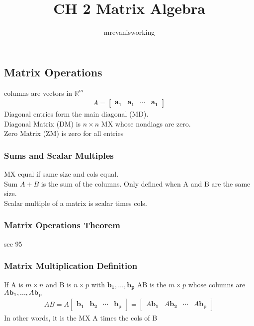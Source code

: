 \documentclass[12pt]{article}
\newcommand{\R}{\mathbb{R}}
\begin{document}
\title{CH 2 Matrix Algebra}
\author{mrevanisworking}
\maketitle

\subsection{Matrix Operations}
    columns are vectors in $ \R^m $ 
    \begin{align*}
        A = \begin{bmatrix}
            \bm{a_{1}} & \bm{a_{1}} & \cdots & \bm{a_{1}} 
        \end{bmatrix}
    \end{align*} 
    Diagonal entries form the main diagonal (MD). \\
    Diagonal Matrix (DM) is $ n \times n $  MX whose nondiags are zero. \\
    Zero Matrix (ZM) is zero for all entries 
    \subsubsection{Sums and Scalar Multiples}
        MX equal if same size and cols equal. \\
        Sum $ A + B $  is the sum of the columns. Only defined when A and B
        are the same size. \\
        Scalar multiple of a matrix is scalar times cols.
    \subsubsection{Matrix Operations Theorem}
        see 95 
    \subsubsection{Matrix Multiplication Definition}
        If A is $ m \times n $  and B is $ n \times p $  with
        $ \bm{b_{1}},\dots ,\bm{b_{p}} $ AB is the $ m \times p $  whose columns
    are $ A\bm{b_{1}},...,A\bm{b_{p}} $
    \begin{align*}
        AB =  A\begin{bmatrix}
            \bm{b_{1}} & \bm{b_{2}} & \cdots & \bm{b_{p}}
        \end{bmatrix} = \begin{bmatrix}
            A\bm{b_{1}} & A\bm{b_{2}} & \cdots & A\bm{b_{p}}
        \end{bmatrix}
    \end{align*}
        In other words, it is the MX A times the cols of B
\end{document}

